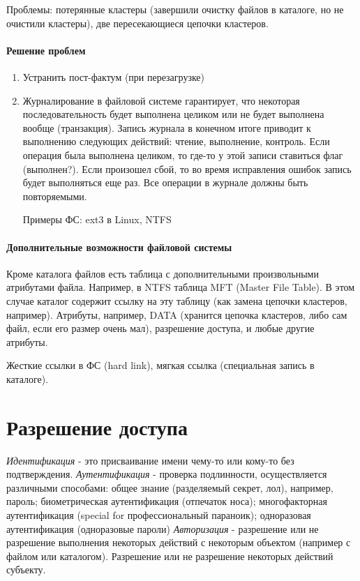 \documentclass[]{article}
\begin{document}
		Проблемы: потерянные кластеры (завершили очистку файлов в каталоге, но не очистили кластеры), две пересекающиеся цепочки кластеров.
		
		\paragraph{Решение проблем}
		\begin{enumerate}
			\item Устранить пост-фактум (при перезагрузке)
			\item Журналирование в файловой системе гарантирует, что некоторая последовательность будет выполнена целиком или не будет выполнена вообще (транзакция). Запись журнала в конечном итоге приводит к выполнению следующих действий: чтение, выполнение, контроль. Если операция была выполнена целиком, то где-то у этой записи ставиться флаг (выполнен?). Если произошел сбой, то во время исправления ошибок запись будет выполняться еще раз. Все операции в журнале должны быть повторяемыми.	
			
			Примеры ФС: ext3 в Linux, NTFS
		\end{enumerate}
		
		\paragraph{Дополнительные возможности файловой системы}
		Кроме каталога файлов есть таблица с дополнительными произвольными атрибутами файла. Например, в NTFS таблица MFT (Master File Table). В этом случае каталог содержит ссылку на эту таблицу (как замена цепочки кластеров, например). Атрибуты, например, DATA (хранится цепочка кластеров, либо сам файл, если его размер очень мал), разрешение доступа, и любые другие атрибуты.
		
		Жесткие ссылки в ФС (hard link), мягкая ссылка (специальная запись в каталоге).
		
		\section{Разрешение доступа}
		\textit{Идентификация} - это присваивание имени чему-то или кому-то без подтверждения.
		\textit{Аутентификация} - проверка подлинности, осуществляется различными способами: общее знание (разделяемый секрет, лол), например, пароль; биометрическая аутентификация (отпечаток носа); многофакторная аутентификация (special for профессиональный параноик); одноразовая аутентификация (одноразовые пароли)
		\textit{Авторизация} - разрешение или не разрешение выполнения некоторых действий с некоторым объектом (например с файлом или каталогом). Разрешение или не разрешение некоторых действий субъекту.
		
\end{document}
